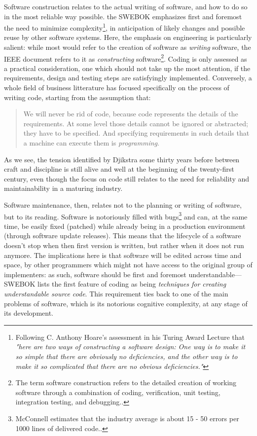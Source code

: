 Software construction relates to the actual writing of software, and how to do so in the most reliable way possible. the SWEBOK emphasizes first and foremost the need to minimize complexity\footnote{Following C. Anthony Hoare's assessment in his Turing Award Lecture that \emph{"here are two ways of constructing a software design: One way is to make it so simple that there are obviously no deficiencies, and the other way is to make it so complicated that there are no obvious deficiencies."}}, in anticipation of likely changes and possible reuse by other software systems. Here, the emphasis on engineering is particularly salient: while most would refer to the creation of software as \emph{writing} software, the IEEE document refers to it as \emph{constructing} software\footnote{The term software construction refers to the detailed creation of working software through a combination of coding, verification, unit testing, integration testing, and debugging.\cite{bourque_swebok_2014}.}. Coding is only assessed as a practical consideration, one which should not take up the most attention, if the requirements, design and testing steps are satisfyingly implemented. Conversely, a whole field of business litterature has focused specifically on the process of writing code, starting from the assumption that:

\begin{quote}
    We will never be rid of code, because code represents the details of the requirements. At some level those details cannot be ignored or abstracted; they have to be specified. And specifying requirements in such details that a machine can execute them is \emph{programming}.\cite{martin_clean_2008}
\end{quote}

As we see, the tension identified by Djikstra some thirty years before between craft and discipline is still alive and well at the beginning of the twenty-first century, even though the focus on code still relates to the need for reliability and maintainability in a maturing industry.

Software maintenance, then, relates not to the planning or writing of software, but to its reading. Software is notoriously filled with bugs\footnote{McConnell estimates that the industry average is about 15 - 50 errors per 1000 lines of delivered code.\cite{mcconnell_code_2004}.} and can, at the same time, be easily fixed (patched) while already being in a production environment (through software update releases). This means that the lifecycle of a software doesn't stop when then first version is written, but rather when it does not run anymore. The implications here is that software will be edited across time and space, by other programmers which might not have access to the original group of implementers: as such, software should be first and foremost understandable—SWEBOK lists the first feature of coding as being \emph{techniques for creating understandable source code}\cite{bourque_swebok_2014}. This requirement ties back to one of the main problems of software, which is its notorious cognitive complexity, at any stage of its development.


